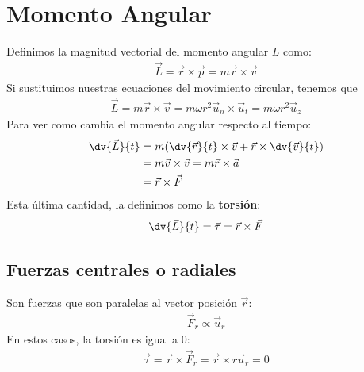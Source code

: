 \documentclass{article}
\begin{document}
\section{Momento Angular}
Definimos la magnitud vectorial del momento angular $L$ como:
\begin{equation}
    \begin{split}
        \vec{L} = \vec{r} \times \vec{p} = m \vec{r} \times \vec{v}
    \end{split}
\end{equation}
Si sustituimos nuestras ecuaciones del movimiento circular, tenemos que
\begin{equation}
    \begin{split}
        \vec{L} = m \vec{r} \times \vec{v} = m\omega r^{2} \vec{u}_n \times \vec{u}_t
        = m\omega r^{2} \vec{u}_z
    \end{split}
\end{equation}
Para ver como cambia el momento angular respecto al tiempo:
\begin{equation}
    \begin{split}
        \dv{\vec{L}}{t} &= m (\dv{\vec{r}}{t} \times \vec{v} + \vec{r}\times \dv{\vec{v}}{t})\\
        &= m \vec{v} \times \vec{v} = m\vec{r} \times \vec{a}\\
        &= \vec{r} \times \vec{F}
    \end{split}
\end{equation}
Esta última cantidad, la definimos como la \textbf{torsión}:
\begin{equation}
    \begin{split}
        \dv{\vec{L}}{t} = \vec{\tau }= \vec{r} \times \vec{F}
    \end{split}
\end{equation}
\subsection{Fuerzas centrales o radiales}
Son fuerzas que son paralelas al vector posición $\vec{r}$:
\begin{equation}
    \begin{split}
        \vec{F}_{r} \propto \vec{u}_r
    \end{split}
\end{equation}
En estos casos, la torsión es igual a $0$:
\begin{equation}
    \begin{split}
        \vec{\tau }= \vec{r} \times \vec{F}_r = \vec{r} \times r \vec{u}_r = 0
    \end{split}
\end{equation}
\end{document}
